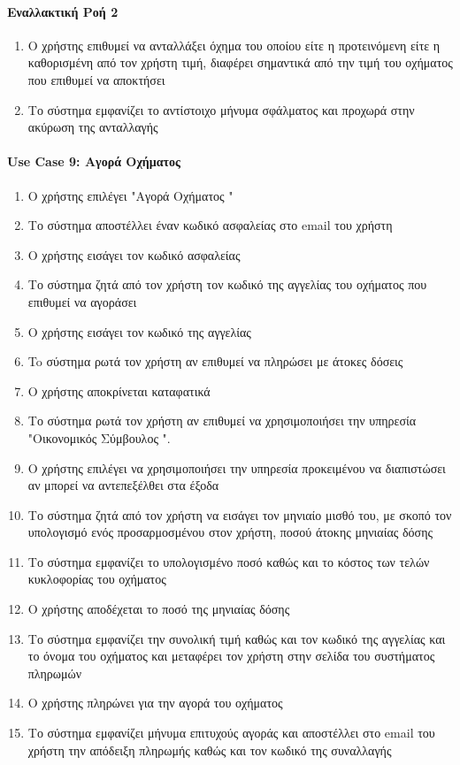 \documentclass{../ol-softwaremanual}
\begin{document}
	
	\paragraph{Εναλλακτική Ροή 2}
	\begin{enumerate}
		\item Ο χρήστης επιθυμεί να ανταλλάξει όχημα του οποίου είτε η προτεινόμενη είτε η καθορισμένη από τον χρήστη τιμή, διαφέρει σημαντικά από την τιμή του οχήματος που επιθυμεί να αποκτήσει
		\item Το σύστημα εμφανίζει το αντίστοιχο μήνυμα σφάλματος και προχωρά στην ακύρωση της ανταλλαγής 
	\end{enumerate}
	
	\paragraph{\en Use Case 9: \gr Αγορά Οχήματος\gr}
	
	\begin{enumerate}
		\item Ο χρήστης επιλέγει \en"\gr Αγορά Οχήματος \en"\gr
		\item Το σύστημα αποστέλλει έναν κωδικό ασφαλείας στο \en email \gr του χρήστη
		\item Ο χρήστης εισάγει τον κωδικό ασφαλείας		
		\item Το σύστημα ζητά από τον χρήστη τον κωδικό της αγγελίας του οχήματος που επιθυμεί να αγοράσει
		\item Ο χρήστης εισάγει τον κωδικό της αγγελίας	
		\item To σύστημα ρωτά τον χρήστη αν επιθυμεί να πληρώσει με άτοκες δόσεις
		\item Ο χρήστης αποκρίνεται καταφατικά			
		\item Το σύστημα ρωτά τον χρήστη αν επιθυμεί να χρησιμοποιήσει την υπηρεσία \en"\gr Οικονομικός Σύμβουλος \en"\gr.
		\item Ο χρήστης επιλέγει να χρησιμοποιήσει την υπηρεσία προκειμένου να διαπιστώσει αν μπορεί να αντεπεξέλθει στα έξοδα 
		\item Το σύστημα ζητά από τον χρήστη να εισάγει τον μηνιαίο μισθό του, με σκοπό τον υπολογισμό ενός προσαρμοσμένου στον χρήστη, ποσού άτοκης μηνιαίας δόσης
		\item Το σύστημα εμφανίζει το υπολογισμένο ποσό καθώς και το κόστος των τελών κυκλοφορίας του οχήματος
		\item Ο χρήστης αποδέχεται το ποσό της μηνιαίας δόσης
		\item Το σύστημα εμφανίζει την συνολική τιμή καθώς και τον κωδικό της αγγελίας και το όνομα του οχήματος και μεταφέρει τον χρήστη στην σελίδα του συστήματος πληρωμών
		\item Ο χρήστης πληρώνει για την αγορά του οχήματος
		\item Το σύστημα εμφανίζει μήνυμα επιτυχούς αγοράς και αποστέλλει στο \en email \gr του χρήστη την απόδειξη πληρωμής καθώς και τον κωδικό της συναλλαγής
	\end{enumerate}
	
\end{document}
